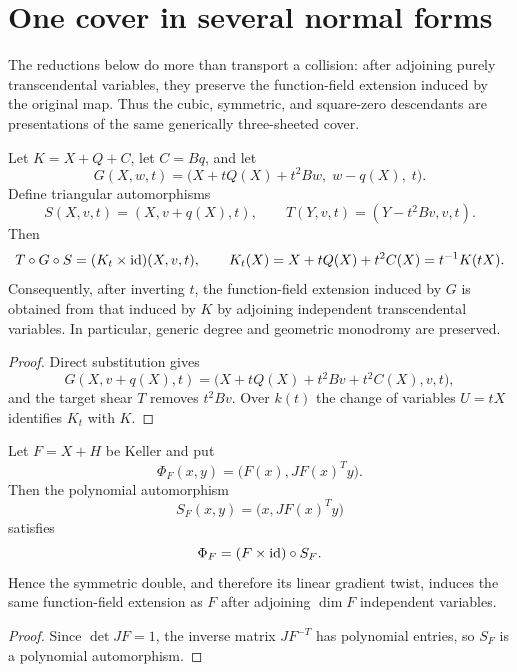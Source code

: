 



\section{One cover in several normal forms}
\label{sec:one-cover}

The reductions below do more than transport a collision: after adjoining purely
transcendental variables, they preserve the function-field extension induced by
the original map.  Thus the cubic, symmetric, and square-zero descendants are
presentations of the same generically three-sheeted cover.

\begin{proposition}
\label{prop:rees-presentation}
Let $K=X+Q+C$, let $C=Bq$, and let
\[
G(X,w,t)=\bigl(X+tQ(X)+t^2Bw,\;w-q(X),\;t\bigr).
\]
Define triangular automorphisms
\[
S(X,v,t)=(X,v+q(X),t),\qquad
T(Y,v,t)=(Y-t^2Bv,v,t).
\]
Then
\[
T\circ G\circ S=(K_t\times\operatorname{id})(X,v,t),
\qquad
K_t(X)=X+tQ(X)+t^2C(X)=t^{-1}K(tX).
\]
Consequently, after inverting $t$, the function-field extension induced by $G$
is obtained from that induced by $K$ by adjoining independent transcendental
variables.  In particular, generic degree and geometric monodromy are
preserved.
\end{proposition}

\begin{proof}
Direct substitution gives
\[
G(X,v+q(X),t)
 =\bigl(X+tQ(X)+t^2Bv+t^2C(X),v,t\bigr),
\]
and the target shear $T$ removes $t^2Bv$.  Over $k(t)$ the change of variables
$U=tX$ identifies $K_t$ with $K$.
\end{proof}

\begin{proposition}
Let $F=X+H$ be Keller and put
\[
\Phi_F(x,y)=\bigl(F(x),JF(x)^Ty\bigr).
\]
Then the polynomial automorphism
\[
S_F(x,y)=\bigl(x,JF(x)^Ty\bigr)
\]
satisfies
\[
\Phi_F=(F\times\operatorname{id})\circ S_F.
\]
Hence the symmetric double, and therefore its linear gradient twist, induces
the same function-field extension as $F$ after adjoining $\dim F$ independent
variables.
\end{proposition}

\begin{proof}
Since $\det JF=1$, the inverse matrix $JF^{-T}$ has polynomial entries, so $S_F$
is a polynomial automorphism.
\end{proof}

